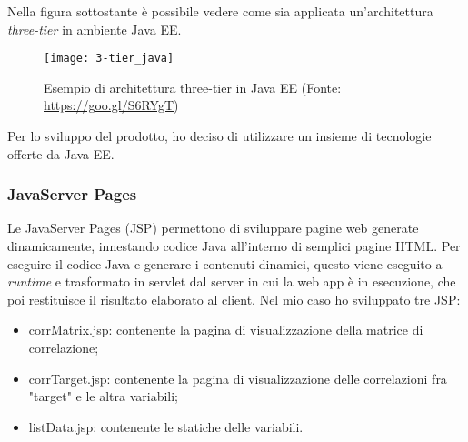 Nella figura sottostante è possibile vedere come sia applicata un'architettura \textit{three-tier} in ambiente Java EE.
\begin{figure}[!h]
	\centering
	\texttt{[image: 3-tier\_java]}
	\caption{Esempio di architettura three-tier in Java EE (Fonte: \href{https://goo.gl/S6RYgT}{https://goo.gl/S6RYgT})}
\end{figure}

Per lo sviluppo del prodotto, ho deciso di utilizzare un insieme di tecnologie offerte da Java EE.
\subsubsection{JavaServer Pages}
Le JavaServer Pages (JSP) permettono di sviluppare pagine web generate dinamicamente, innestando codice Java all'interno di semplici pagine HTML. Per eseguire il codice Java e generare i contenuti dinamici, questo viene eseguito a \textit{runtime} e trasformato in servlet dal server in cui la \gls{web app} è in esecuzione, che poi restituisce il risultato elaborato al client.
Nel mio caso ho sviluppato tre JSP:
\begin{itemize}
	\item corrMatrix.jsp: contenente la pagina di visualizzazione della matrice di correlazione;
	\item corrTarget.jsp: contenente la pagina di visualizzazione delle correlazioni fra "target" e le altra variabili;
	\item listData.jsp: contenente le statiche delle variabili.
\end{itemize}
